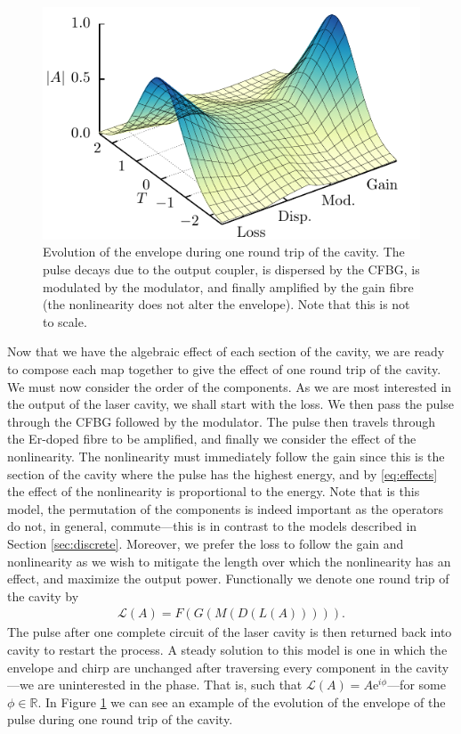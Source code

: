 \documentclass[10pt,twocolumn,a4paper]{article}
\begin{document}
\begin{figure}[tbp]
	\centering
	\includegraphics{Evo}
	\caption{Evolution of the envelope during one round trip of the cavity. The pulse decays due to the output coupler, is dispersed by the CFBG, is modulated by the modulator, and finally amplified by the gain fibre (the nonlinearity does not alter the envelope). Note that this is not to scale.}
	\label{fig:cavityevo}
\end{figure}

Now that we have the algebraic effect of each section of the cavity, we are ready to compose each map together to give the effect of one round trip of the cavity. We must now consider the order of the components. As we are most interested in the output of the laser cavity, we shall start with the loss. We then pass the pulse through the CFBG followed by the modulator. The pulse then travels through the Er-doped fibre to be amplified, and finally we consider the effect of the nonlinearity. The nonlinearity must immediately follow the gain since this is the section of the cavity where the pulse has the highest energy, and by \eqref{eq:effects} the effect of the nonlinearity is proportional to the energy. Note that is this model, the permutation of the components is indeed important as the operators do not, in general, commute---this is in contrast to the models described in Section \ref{sec:discrete}. Moreover, we prefer the loss to follow the gain and nonlinearity as we wish to mitigate the length over which the nonlinearity has an effect, and maximize the output power. Functionally we denote one round trip of the cavity by
\begin{align}
	\mathcal{L}(A) = F(G(M(D(L(A))))).
\end{align}
 The pulse after one complete circuit of the laser cavity is then returned back into cavity to restart the process. A steady solution to this model is one in which the envelope and chirp are unchanged after traversing every component in the cavity---we are uninterested in the phase. That is, such that $\mathcal{L}(A) = A \textrm{e}^{i \phi}$---for some $\phi \in \mathbb{R}$. In Figure \ref{fig:cavityevo} we can see an example of the evolution of the envelope of the pulse during one round trip of the cavity.
\end{document}
